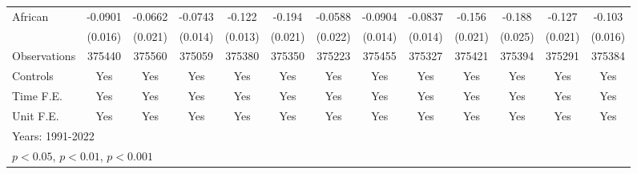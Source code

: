 \begin{sidewaystable}[htbp]
\begin{tabular}{l*{12}{c}}
\addlinespace
African        &  -0.0901\sym{***}&  -0.0662\sym{**} &  -0.0743\sym{***}&   -0.122\sym{***}&   -0.194\sym{***}&  -0.0588\sym{**} &  -0.0904\sym{***}&  -0.0837\sym{***}&   -0.156\sym{***}&   -0.188\sym{***}&   -0.127\sym{***}&   -0.103\sym{***}\\
               &  (0.016)         &  (0.021)         &  (0.014)         &  (0.013)         &  (0.021)         &  (0.022)         &  (0.014)         &  (0.014)         &  (0.021)         &  (0.025)         &  (0.021)         &  (0.016)         \\
\midrule
Observations   &   375440         &   375560         &   375059         &   375380         &   375350         &   375223         &   375455         &   375327         &   375421         &   375394         &   375291         &   375384         \\
Controls       &      Yes         &      Yes         &      Yes         &      Yes         &      Yes         &      Yes         &      Yes         &      Yes         &      Yes         &      Yes         &      Yes         &      Yes         \\
Time F.E.      &      Yes         &      Yes         &      Yes         &      Yes         &      Yes         &      Yes         &      Yes         &      Yes         &      Yes         &      Yes         &      Yes         &      Yes         \\
Unit F.E.      &      Yes         &      Yes         &      Yes         &      Yes         &      Yes         &      Yes         &      Yes         &      Yes         &      Yes         &      Yes         &      Yes         &      Yes         \\
\bottomrule
\multicolumn{13}{l}{\footnotesize Years: 1991-2022}\\
\multicolumn{13}{l}{\footnotesize \sym{*} \(p<0.05\), \sym{**} \(p<0.01\), \sym{***} \(p<0.001\)}\\
\end{tabular}
\end{sidewaystable}
